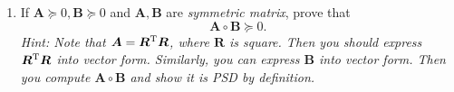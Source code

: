 \begin{enumerate}
\begin{enumerate}
\\
\item
If $\bm A\succeq0,\bm B\succeq0$ and $\bm A,\bm B$ are \textit{symmetric matrix}, prove that
\[
\bm A\circ\bm B\succeq0.
\]
\textit{Hint: Note that $\bm A=\bm R^{\mathrm T}\bm R$, where $\bm R$ is square. Then you should express $\bm R^{\mathrm T}\bm R$ into vector form. Similarly, you can express $\bm B$ into vector form. Then you compute $\bm A\circ\bm B$ and show it is PSD by definition.}
\end{enumerate}
\end{enumerate}
